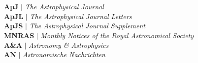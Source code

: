 \documentclass[11pt]{article}
\begin{document}
\vspace*{10mm}

\\ \\
\textbf{ApJ} $|$ {\it The Astrophysical Journal}\\
\textbf{ApJL} $|$ {\it The Astrophysical Journal Letters}\\
\textbf{ApJS} $|$ {\it The Astrophysical Journal Supplement}\\
\textbf{MNRAS} $|$ {\it Monthly Notices of the Royal Astronomical Society}\\
\textbf{A\&A} $|$ {\it Astronomy \& Astrophysics}\\
\textbf{AN} $|$ {\it Astronomische Nachrichten} \\
\end{document}
